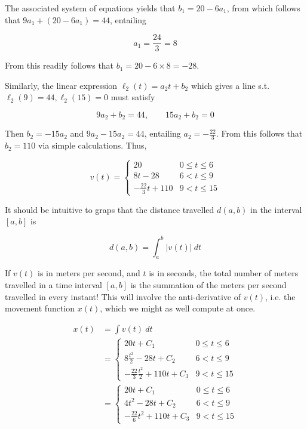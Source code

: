 \documentclass[12pt]{article}
\theoremstyle{definition}
\begin{document}
The associated system of equations yields that $b_1 = 20 - 6a_1$, from which
follows that $9a_1 + (20 - 6a_1) = 44$, entailing 

\begin{equation*}
    a_1 = \frac{24}{3} = 8
\end{equation*}

From this readily follows that $b_1 = 20 - 6\times 8 = -28$. 

Similarly, the linear expression $\ell_2(t) = a_2t + b_2$ which gives a line
s.t. $\ell_2(9) = 44, \ell_2(15) = 0$ must satisfy 

\begin{equation*}
    9a_2 + b_2 = 44, \qquad 15a_2 + b_2 = 0
\end{equation*}

Then $b_2 = -15a_2$ and $9a_2 -15a_2 = 44$, entailing $a_2 = -\frac{22}{3}$.
From this follows that $b_2 = 110$ via simple calculations. Thus, 


\begin{equation*}
    v(t) = \begin{cases}
        20 & 0 \leq t \leq 6 \\ 
        8t - 28 & 6 < t \leq 9 \\ 
        -\frac{22}{3}t + 110 & 9 < t \leq 15
    \end{cases}
\end{equation*}

It should be intuitive to graps that the distance travelled $d(a, b)$ in the interval
$[a, b]$ is

\begin{equation*}
    d(a, b) = \int_a^b |v(t)| ~ dt
\end{equation*}

If $v(t)$ is in meters per second, and $t$ is in seconds, the total number of
meters travelled in a time interval $[a, b]$ is the summation of the meters per
second travelled in every instant! This will involve the anti-derivative of 
$v(t)$, i.e. the movement function $x(t)$, which we might as well compute at
once. 

\begin{align*}
    x(t) 
    &= \int v(t) ~ dt \\ 
    &= \begin{cases}
        20t + C_1 & 0 \leq t \leq 6 \\ 
        8\frac{t^2}{2} - 28t + C_2 & 6 < t \leq 9 \\ 
        -\frac{22}{3} \frac{t^2}{2} + 110t + C_3 & 9 < t \leq 15
    \end{cases} \\ 
    &= \begin{cases}
        20t + C_1 & 0 \leq t \leq 6 \\ 
        4t^2 - 28t + C_2  & 6 < t \leq 9 \\ 
        -\frac{22}{6} t^2 + 110t + C_3& 9 < t \leq 15
    \end{cases}
\end{align*}
\end{document}

